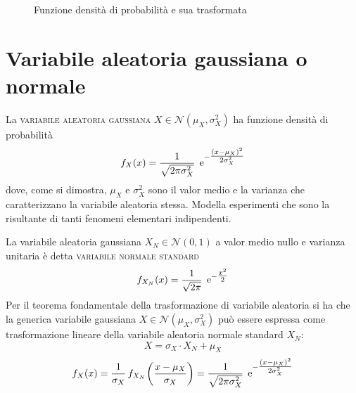 \begin{esempio}
\begin{figure}[h]
\centering
{}\qquad
{}
\caption{Funzione densità di probabilità e sua trasformata}
\end{figure}

\end{esempio}

\section{Variabile aleatoria gaussiana o normale}
La \textsc{variabile aleatoria gaussiana} $X\in\mathcal{N}(\mu_X,\sigma^2_X)$ ha funzione densità di probabilità
\begin{equation}\label{eq:densita_gaussiana}
f_X(x)=\frac{1}{\sqrt{2\pi\sigma^2_X}}\;\operatorname{e}^{-\tfrac{(x-\mu_X)^2}{2\sigma^2_X}}
\end{equation}
dove, come si dimostra, $\mu_X$ e $\sigma^2_X$ sono il valor medio e la varianza che caratterizzano la variabile aleatoria stessa.
Modella esperimenti che sono la risultante di tanti fenomeni elementari indipendenti.

La variabile aleatoria gaussiana $X_N\in\mathcal{N}(0,1)$ a valor medio nullo e varianza unitaria è detta \textsc{variabile normale standard}
\begin{equation}\label{eq:densita_normale}
f_{X_N}(x)=\frac{1}{\sqrt{2\pi}}\;\operatorname{e}^{-\tfrac{x^2}{2}}
\end{equation}
Per il teorema fondamentale della trasformazione di variabile aleatoria si ha che la generica variabile gaussiana $X\in\mathcal{N}(\mu_X,\sigma^2_X)$ può essere espressa come trasformazione lineare della variabile aleatoria normale standard $X_N$:
\begin{equation}X=\sigma_X\cdot X_N+\mu_X\end{equation}
\begin{equation}
f_X(x)=\frac{1}{\sigma_X}\,{f_{X_N}}^{}\!\left({\frac{x-\mu_X}{\sigma_X}}\right)=\frac{1}{\sqrt{2\pi\sigma^2_X}}\;\operatorname{e}^{-\tfrac{(x-\mu_X)^2}{2\sigma^2_X}}
\end{equation}


